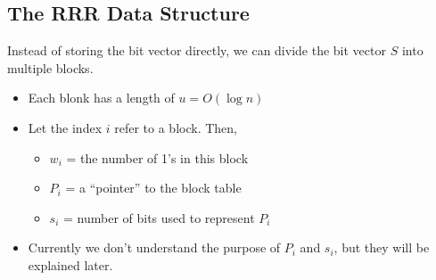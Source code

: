 \documentclass[10pt]{article}
\begin{document}
\subsection*{The RRR Data Structure}
Instead of storing the bit vector directly, we can divide the bit vector $S$ into multiple blocks.
\begin{itemize}
    \item Each blonk has a length of $u = O(\log n)$
    \item Let the index $i$ refer to a block.  Then,
    \begin{itemize}
        \item $w_i$ = the number of 1's in this block
        \item $P_i$ = a ``pointer'' to the block table
        \item $s_i$ = number of bits used to represent $P_i$
    \end{itemize}
    \item Currently we don't understand the purpose of $P_i$ and $s_i$, but they will be explained later.
\end{itemize}
\end{document}
